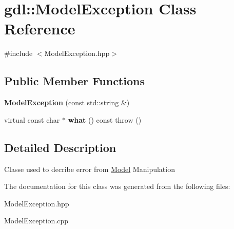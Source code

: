 \hypertarget{classgdl_1_1ModelException}{
\section{gdl::ModelException Class Reference}
\label{classgdl_1_1ModelException}
}


{\ttfamily \#include $<$ModelException.hpp$>$}\subsection*{Public Member Functions}
\begin{DoxyCompactItemize}
\item 
\hypertarget{classgdl_1_1ModelException_a20ca1764d4e9c7f247f35f873f111cef}{
{\bfseries ModelException} (const std::string \&)}
\label{classgdl_1_1ModelException_a20ca1764d4e9c7f247f35f873f111cef}

\item 
\hypertarget{classgdl_1_1ModelException_ac570e43873bd20fcc1f2ec3f3a09ed4d}{
virtual const char $\ast$ {\bfseries what} () const   throw ()}
\label{classgdl_1_1ModelException_ac570e43873bd20fcc1f2ec3f3a09ed4d}

\end{DoxyCompactItemize}


\subsection{Detailed Description}
Classe used to decribe error from \hyperlink{classgdl_1_1Model}{Model} Manipulation 

The documentation for this class was generated from the following files:\begin{DoxyCompactItemize}
\item 
ModelException.hpp\item 
ModelException.cpp\end{DoxyCompactItemize}
